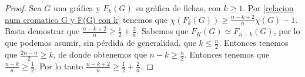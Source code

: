     \begin{proof}
        Sea $G$ una gr\'afica y $F_k(G)$ su gr\'afica de fichas, con $k \geq 1$. Por
        \cref{relacion num cromatico G y F(G) con k} tenemos que $\chi(F_k(G)) \geq
        \frac{n-k+2}{n} \chi(G) -1$. Basta demostrar que $\frac{n-k+2}{n} \geq
        \frac{1}{2}+\frac{2}{n}$. Sabemos que $F_K(G) \simeq F_{n-k}(G)$, por lo que
        podemos asumir, sin p\'erdida de generalidad, que $k\leq \frac{n}{2}$.
        Entonces tenemos que $\frac{2n-n}{2}\geq k$, de donde obtenemos que $n-k
        \geq \frac{n}{2}$. Entonces tenemos que $\frac{n-k}{n}\geq \frac{1}{2}$. Por
        lo tanto $\frac{n-k+2}{n} \geq \frac{1}{2}+\frac{2}{n}$.
    \end{proof}